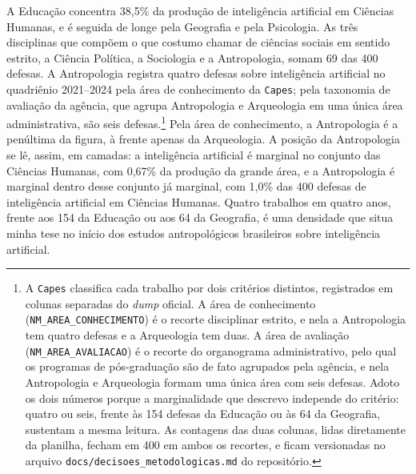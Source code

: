 A Educação concentra 38,5\% da produção de inteligência artificial em Ciências Humanas, e é seguida de longe pela Geografia e pela Psicologia. As três disciplinas que compõem o que costumo chamar de ciências sociais em sentido estrito, a Ciência Política, a Sociologia e a Antropologia, somam 69 das 400 defesas. A Antropologia registra quatro defesas sobre inteligência artificial no quadriênio 2021--2024 pela área de conhecimento da \texttt{Capes}; pela taxonomia de avaliação da agência, que agrupa Antropologia e Arqueologia em uma única área administrativa, são seis defesas.\footnote{A \texttt{Capes} classifica cada trabalho por dois critérios distintos, registrados em colunas separadas do \emph{dump} oficial. A área de conhecimento (\texttt{NM\_AREA\_CONHECIMENTO}) é o recorte disciplinar estrito, e nela a Antropologia tem quatro defesas e a Arqueologia tem duas. A área de avaliação (\texttt{NM\_AREA\_AVALIACAO}) é o recorte do organograma administrativo, pelo qual os programas de pós-graduação são de fato agrupados pela agência, e nela Antropologia e Arqueologia formam uma única área com seis defesas. Adoto os dois números porque a marginalidade que descrevo independe do critério: quatro ou seis, frente às 154 defesas da Educação ou às 64 da Geografia, sustentam a mesma leitura. As contagens das duas colunas, lidas diretamente da planilha, fecham em 400 em ambos os recortes, e ficam versionadas no arquivo \texttt{docs/decisoes\_metodologicas.md} do repositório.} Pela área de conhecimento, a Antropologia é a penúltima da figura, à frente apenas da Arqueologia. A posição da Antropologia se lê, assim, em camadas: a inteligência artificial é marginal no conjunto das Ciências Humanas, com 0,67\% da produção da grande área, e a Antropologia é marginal dentro desse conjunto já marginal, com 1,0\% das 400 defesas de inteligência artificial em Ciências Humanas. Quatro trabalhos em quatro anos, frente aos 154 da Educação ou aos 64 da Geografia, é uma densidade que situa minha tese no início dos estudos antropológicos brasileiros sobre inteligência artificial.

